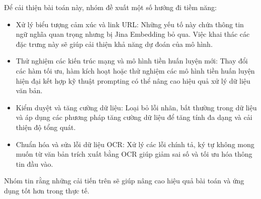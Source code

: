 \documentclass[11pt]{article}
\begin{document}
Để cải thiện bài toán này, nhóm đề xuất một số hướng đi tiềm năng:
\vspace*{-3mm}
\begin{itemize}
\item Xử lý biểu tượng cảm xúc và link URL: Những yếu tố này chứa thông tin ngữ nghĩa quan trọng nhưng bị Jina Embedding bỏ qua. Việc khai thác các đặc trưng này sẽ giúp cải thiện khả năng dự đoán của mô hình.
\vspace*{-3mm}
\item Thử nghiệm các kiến trúc mạng và mô hình tiền huấn luyện mới: Thay đổi các hàm tối ưu, hàm kích hoạt hoặc thử nghiệm các mô hình tiền huấn luyện hiện đại kết hợp kỹ thuật prompting có thể nâng cao hiệu quả xử lý dữ liệu văn bản.
\vspace*{-3mm}
\item Kiểm duyệt và tăng cường dữ liệu: Loại bỏ lỗi nhãn, bất thường trong dữ liệu và áp dụng các phương pháp tăng cường dữ liệu để tăng tính đa dạng và cải thiện độ tổng quát.
\vspace*{-3mm}
\item Chuẩn hóa và sửa lỗi dữ liệu OCR: Xử lý các lỗi chính tả, ký tự không mong muốn từ văn bản trích xuất bằng OCR giúp giảm sai số và tối ưu hóa thông tin đầu vào.
\end{itemize}
\vspace*{-3mm}
Nhóm tin rằng những cải tiến trên sẽ giúp nâng cao hiệu quả bài toán và ứng dụng tốt hơn trong thực tế.

\nocite{*}

\printbibliography[title={Tham khảo}]
\end{document}
